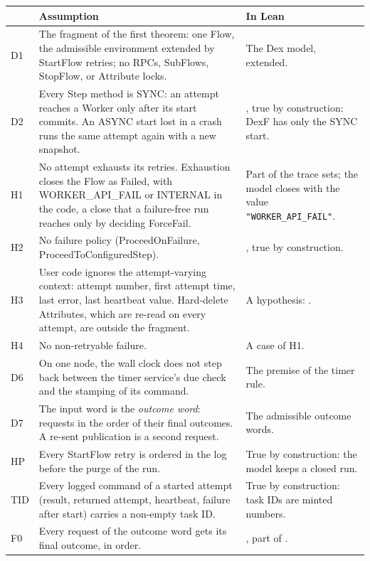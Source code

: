\begin{table}[t]
\centering
\small
\begin{tabularx}{\textwidth}{@{}P{1.2cm}LP{4.6cm}@{}}
\toprule
 & Assumption & In Lean \\
\midrule
D1 & The fragment of the first theorem: one Flow, the admissible
  environment extended by StartFlow retries; no RPCs, SubFlows, StopFlow,
  or Attribute locks. & The Dex model, extended. \\
D2 & Every Step method is SYNC: an attempt reaches a Worker only after its
  start commits. An ASYNC start lost in a crash runs the same attempt again
  with a new snapshot. & , true by construction: DexF has
  only the SYNC start. \\
H1 & No attempt exhausts its retries. Exhaustion closes the Flow as
  Failed, with WORKER\_API\_FAIL or INTERNAL in the code, a close that a
  failure-free run reaches only by deciding ForceFail. & Part of the trace
  sets; the model closes with the value \texttt{"WORKER\_API\_FAIL"}. \\
H2 & No failure policy (ProceedOnFailure, ProceedToConfiguredStep). &
  , true by construction. \\
H3 & User code ignores the attempt-varying context: attempt number, first
  attempt time, last error, last heartbeat value. Hard-delete Attributes,
  which are re-read on every attempt, are outside the fragment. & A
  hypothesis: . \\
H4 & No non-retryable failure. & A case of H1. \\
D6 & On one node, the wall clock does not step back between the timer
  service's due check and the stamping of its command. & The premise of
  the timer rule. \\
D7 & The input word is the \emph{outcome word}: requests in the order of
  their final outcomes. A re-sent publication is a second request. & The
  admissible outcome words. \\
HP & Every StartFlow retry is ordered in the log before the purge of the
  run. & True by construction: the model keeps a closed run. \\
TID & Every logged command of a started attempt (result, returned
  attempt, heartbeat, failure after start) carries a non-empty task ID. &
  True by construction: task IDs are minted numbers. \\
F0 & Every request of the outcome word gets its final outcome, in order.
  & , part of . \\

\end{tabularx}
\end{table}
